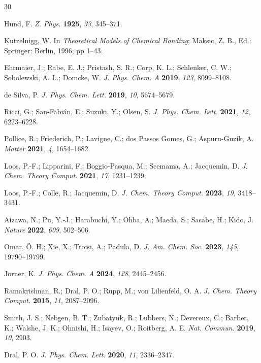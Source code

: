 \documentclass[journal=jcisd8,manuscript=article]{achemso}
\begin{document}
\begin{thebibliography}{30}

Hund, F. \textit{Z. Phys.} \textbf{1925}, \textit{33}, 345--371.

Kutzelnigg, W. In \textit{Theoretical Models of Chemical Bonding}; Maksic, Z. B., Ed.; Springer: Berlin, 1996; pp 1--43.

Ehrmaier, J.; Rabe, E. J.; Pristash, S. R.; Corp, K. L.; Schlenker, C. W.; Sobolewski, A. L.; Domcke, W. \textit{J. Phys. Chem. A} \textbf{2019}, \textit{123}, 8099--8108.

de Silva, P. \textit{J. Phys. Chem. Lett.} \textbf{2019}, \textit{10}, 5674--5679.

Ricci, G.; San-Fabi\'{a}n, E.; Suzuki, Y.; Olsen, S. \textit{J. Phys. Chem. Lett.} \textbf{2021}, \textit{12}, 6223--6228.

Pollice, R.; Friederich, P.; Lavigne, C.; dos Passos Gomes, G.; Aspuru-Guzik, A. \textit{Matter} \textbf{2021}, \textit{4}, 1654--1682.

Loos, P.-F.; Lipparini, F.; Boggio-Pasqua, M.; Scemama, A.; Jacquemin, D. \textit{J. Chem. Theory Comput.} \textbf{2021}, \textit{17}, 1231--1239.

Loos, P.-F.; Colle, R.; Jacquemin, D. \textit{J. Chem. Theory Comput.} \textbf{2023}, \textit{19}, 3418--3431.

Aizawa, N.; Pu, Y.-J.; Harabuchi, Y.; Ohba, A.; Maeda, S.; Sasabe, H.; Kido, J. \textit{Nature} \textbf{2022}, \textit{609}, 502--506.

Omar, \"{O}. H.; Xie, X.; Troisi, A.; Padula, D. \textit{J. Am. Chem. Soc.} \textbf{2023}, \textit{145}, 19790--19799.

Jorner, K. \textit{J. Phys. Chem. A} \textbf{2024}, \textit{128}, 2445--2456.

Ramakrishnan, R.; Dral, P. O.; Rupp, M.; von Lilienfeld, O. A. \textit{J. Chem. Theory Comput.} \textbf{2015}, \textit{11}, 2087--2096.

Smith, J. S.; Nebgen, B. T.; Zubatyuk, R.; Lubbers, N.; Devereux, C.; Barber, K.; Walshe, J. K.; Ohnishi, H.; Isayev, O.; Roitberg, A. E. \textit{Nat. Commun.} \textbf{2019}, \textit{10}, 2903.

Dral, P. O. \textit{J. Phys. Chem. Lett.} \textbf{2020}, \textit{11}, 2336--2347.


\end{thebibliography}
\end{document}

